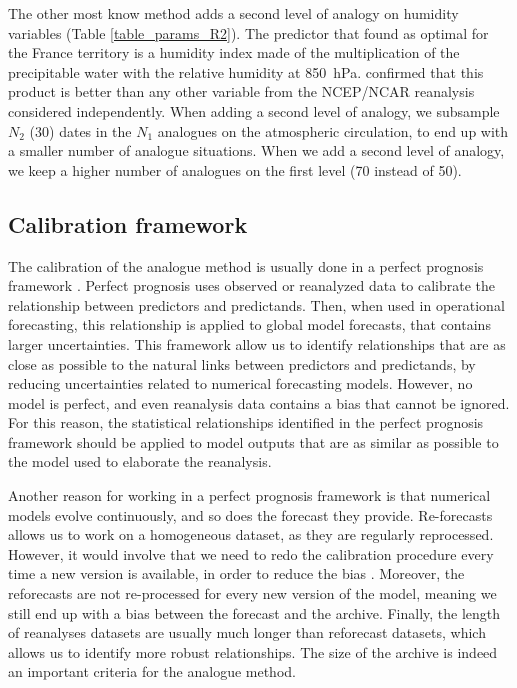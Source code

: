 \documentclass[twocol]{ametsoc}
\begin{document}
The other most know method adds a second level of analogy on humidity variables (Table \ref{table_params_R2}). The predictor that \citet{Bontron2004} found as optimal for the France territory is a humidity index made of the multiplication of the precipitable water with the relative humidity at 850~hPa. \cite{Horton2012a} confirmed that this product is better than any other variable from the NCEP/NCAR reanalysis considered independently. When adding a second level of analogy, we subsample $N_{2}$ (30) dates in the $N_{1}$ analogues on the atmospheric circulation, to end up with a smaller number of analogue situations. When we add a second level of analogy, we keep a higher number of analogues on the first level (70 instead of 50).


\subsection{Calibration framework}

The calibration of the analogue method is usually done in a perfect prognosis \citep{Klein1959} framework \citep{BenDaoud2010, Bontron2004}. Perfect prognosis uses observed or reanalyzed data to calibrate the relationship between predictors and predictands. Then, when used in operational forecasting, this relationship is applied to global model forecasts, that contains larger uncertainties. This framework allow us to identify relationships that are as close as possible to the natural links between predictors and predictands, by reducing uncertainties related to numerical forecasting models. However, no model is perfect, and even reanalysis data contains a bias that cannot be ignored. For this reason, the statistical relationships identified in the perfect prognosis framework should be applied to model outputs that are as similar as possible to the model used to elaborate the reanalysis. 

Another reason for working in a perfect prognosis framework is that numerical models evolve continuously, and so does the forecast they provide. Re-forecasts allows us to work on a homogeneous dataset, as they are regularly reprocessed. However, it would involve that we need to redo the calibration procedure every time a new version is available, in order to reduce the bias \citep{Wilson2002}. Moreover, the reforecasts are not re-processed for every new version of the model, meaning we still end up with a bias between the forecast and the archive. Finally, the length of reanalyses datasets are usually much longer than reforecast datasets, which allows us to identify more robust relationships. The size of the archive is indeed an important criteria for the analogue method.
\end{document}
